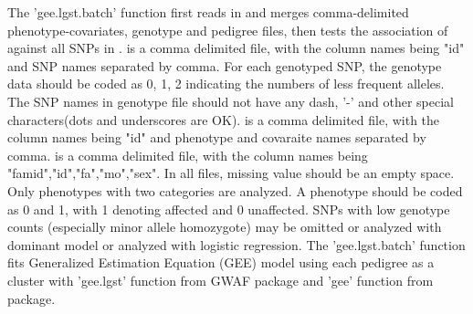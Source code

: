 \begin{Details}\relax
The 'gee.lgst.batch' 
function first reads in and merges comma-delimited phenotype-covariates, genotype 
and pedigree files, then tests the association of  against all SNPs in .
 is a comma delimited file, with the column names being "id" and SNP names separated by comma.
For each genotyped SNP, the genotype data should be coded as 0, 1, 2 indicating the numbers of less frequent 
alleles. The SNP names in genotype file should not have any 
dash, '-' and other special characters(dots and underscores are OK).  is a comma delimited file, with the column names being "id" and phenotype and 
covaraite names separated by comma.  is a comma delimited file, with the column names being 
"famid","id","fa","mo","sex". In all files, missing value should be an empty space.
Only phenotypes with two categories are analyzed. A phenotype should be coded as 
0 and 1, with 1 denoting affected and 0 unaffected. SNPs with low genotype counts 
(especially minor allele homozygote) may be omitted or analyzed with dominant model or
analyzed with logistic regression. 
The 'gee.lgst.batch' function fits Generalized Estimation Equation (GEE) model using each pedigree as a cluster 
with 'gee.lgst' function from GWAF package and 'gee' function from  package.
\end{Details}
